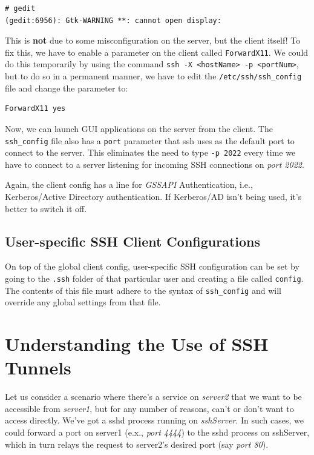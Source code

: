 \vspace{-15pt}
\begin{verbatim}
# gedit 
(gedit:6956): Gtk-WARNING **: cannot open display:
\end{verbatim}
\vspace{-10pt}	

\noindent
This is \textbf{not} due to some misconfiguration on the server, but the client itself! To fix this, we have to enable a parameter on the client called \verb|ForwardX11|. We could do this temporarily by using the command \verb|ssh -X <hostName> -p <portNum>|, but to do so in a permanent manner, we have to edit the \verb|/etc/ssh/ssh_config| file and change the parameter to:

\vspace{-15pt}
\begin{verbatim}
ForwardX11 yes
\end{verbatim}
\vspace{-10pt}	

\noindent
Now, we can launch GUI applications on the server from the client. The \verb|ssh_config| file also has a \verb|port| parameter that ssh uses as the default port to connect to the server. This eliminates the need to type \verb|-p 2022| every time we have to connect to a server listening for incoming SSH connections on \textit{port 2022}. 

Again, the client config has a line for \textit{GSSAPI} Authentication, i.e., Kerberos/Active Directory authentication. If Kerberos/AD isn't being used, it's better to switch it off. 

\subsection{User-specific SSH Client Configurations}
On top of the global client config, user-specific SSH configuration can be set by going to the \verb|.ssh| folder of that particular user and creating a file called \verb|config|. The contents of this file must adhere to the syntax of \verb|ssh_config| and will override any global settings from that file. 

	\section{Understanding the Use of SSH Tunnels}
Let us consider a scenario where there's a service on \textit{server2} that we want to be accessible from \textit{server1}, but for any number of reasons, can't or don't want to access directly. We've got a sshd process running on \textit{sshServer}. In such cases, we could forward a port on server1 (e.x., \textit{port 4444}) to the sshd process on sshServer, which in turn relays the request to server2's desired port (say \textit{port 80}). 

